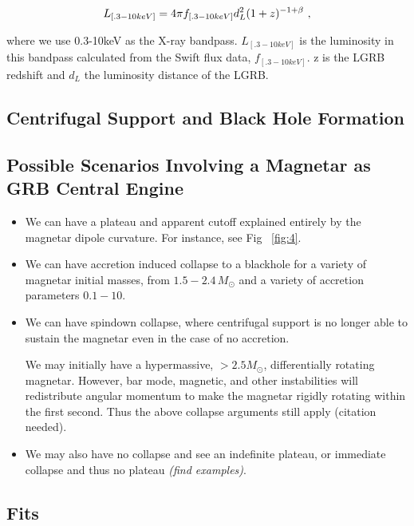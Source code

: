 \documentclass{article}
\begin{document}
\begin{equation} L_{[.3-10 keV]} = 4\pi\* f_{[.3-10 keV]}d_{L}^2  (1+z)^{-1+\beta}\,\,,
\end{equation}

where we use 0.3-10keV as the X-ray bandpass.  $L_{[.3-10 keV]}$ is the luminosity in this bandpass calculated from the Swift flux data,  $f_{[.3-10 keV]}$. z is the LGRB redshift and $d_L$ the luminosity distance of the LGRB.

\subsection{Centrifugal Support and Black Hole Formation}

\subsection{Possible Scenarios Involving a Magnetar as GRB Central Engine}

\begin{itemize}
\item We can have a plateau and apparent cutoff explained entirely by the magnetar dipole curvature. For instance, see Fig  ~\ref{fig:4}. \newline

\item We can have accretion induced collapse to a blackhole for a variety of magnetar initial masses, from $1.5-2.4\, M_{\odot}$ and a variety of accretion parameters $0.1-10$. \newline

\item We can have spindown collapse, where centrifugal support is no longer able to sustain the magnetar even in the case of no accretion. \newline 

We may initially have a hypermassive, $>2.5 M_{\odot}$,  differentially rotating magnetar. However, bar mode, magnetic, and other instabilities will redistribute angular momentum to make the magnetar rigidly rotating within the first second. Thus the above collapse arguments still apply (citation needed). \newline

\item We may also  have no collapse and see an indefinite plateau, or immediate collapse and thus no plateau \textit{(find examples)}.

\end{itemize}
\subsection{Fits}
\end{document}
